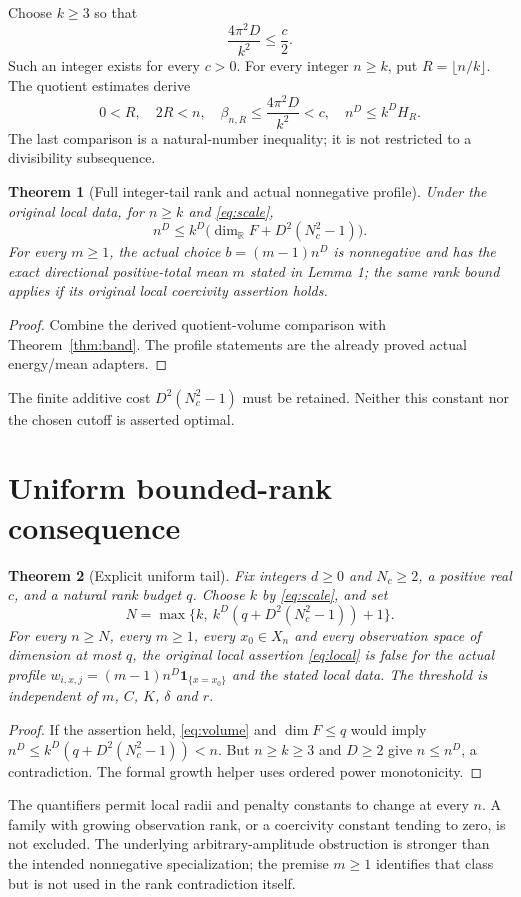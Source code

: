 \documentclass[11pt]{article}
\newtheorem{theorem}{Theorem}
\newcommand{\R}{\mathbb R}
\begin{document}
Choose $k\geq3$ so that
\begin{equation}\label{eq:scale}
 \frac{4\pi^2D}{k^2}\leq\frac c2.
\end{equation}
Such an integer exists for every $c>0$. For every integer $n\geq k$, put
$R=\lfloor n/k\rfloor$. The quotient estimates derive
\[
 0<R,\quad 2R<n,\quad
 \beta_{n,R}\leq\frac{4\pi^2D}{k^2}<c,\quad
 n^D\leq k^D H_R.
\]
The last comparison is a natural-number inequality; it is not restricted
to a divisibility subsequence.

\begin{theorem}[Full integer-tail rank and actual nonnegative profile]
Under the original local data, for $n\geq k$ and \eqref{eq:scale},
\begin{equation}\label{eq:volume}
 n^D\leq k^D\bigl(\dim_{\R}F+D^2(N_c^2-1)\bigr).
\end{equation}
For every $m\geq1$, the actual choice $b=(m-1)n^D$ is nonnegative and has
the exact directional positive-total mean $m$ stated in Lemma 1; the same
rank bound applies if its original local coercivity assertion holds.
\end{theorem}
\begin{proof}
Combine the derived quotient-volume comparison with Theorem~\ref{thm:band}.
The profile statements are the already proved actual energy/mean adapters.
\end{proof}
The finite additive cost $D^2(N_c^2-1)$ must be retained. Neither this
constant nor the chosen cutoff is asserted optimal.

\section{Uniform bounded-rank consequence}
\begin{theorem}[Explicit uniform tail]
Fix integers $d\geq0$ and $N_c\geq2$, a positive real $c$, and
a natural rank budget $q$. Choose $k$ by \eqref{eq:scale}, and set
\[
 N=\max\{k,\ k^D(q+D^2(N_c^2-1))+1\}.
\]
For every $n\geq N$, every $m\geq1$, every $x_0\in X_n$ and every
observation space of dimension at most $q$, the original local assertion
\eqref{eq:local} is false for the actual profile
$w_{i,x,j}=(m-1)n^D\mathbf1_{\{x=x_0\}}$ and the stated local data.
The threshold is independent of $m$, $C$, $K$, $\delta$ and $r$.
\end{theorem}
\begin{proof}
If the assertion held, \eqref{eq:volume} and $\dim F\leq q$ would imply
$n^D\leq k^D(q+D^2(N_c^2-1))<n$. But $n\geq k\geq3$ and $D\geq2$
give $n\leq n^D$, a contradiction. The formal growth helper uses ordered
power monotonicity.
\end{proof}
The quantifiers permit local radii and penalty constants to change at
every $n$. A family with growing observation rank, or a coercivity constant
tending to zero, is not excluded. The underlying arbitrary-amplitude
obstruction is stronger than the intended nonnegative specialization;
the premise $m\geq1$ identifies that class but is not used in the rank
contradiction itself.
\end{document}
